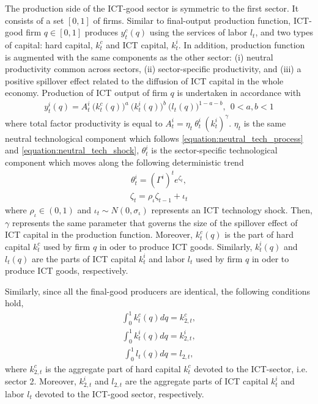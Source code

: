 \documentclass[12pt]{article}
\begin{document}
The production side of the ICT-good sector is symmetric to the first sector. It consists of a set $[0,1]$ of firms. Similar to final-output production function, ICT-good firm $q \in [0,1]$ produces $y^c_t(q)$ using the services of labor $l_{t}$, and two types of capital: hard capital, $k^c_{t}$ and ICT capital, $k^i_{t}$. In addition, production function is augmented with the same components as the other sector: (i) neutral productivity common across sectors, (ii) sector-specific productivity, and (iii) a positive spillover effect related to the diffusion of ICT capital in the whole economy. Production of ICT output of firm $q$ is undertaken in accordance with
\begin{eqnarray}\label{equation:productionICT}
y^i_t(q) = A^i_t \ \big( k^c_{t}(q) \big)^a \ \big( k^i_{t}(q) \big)^b \ \big( l_{t}(q) \big)^{1-a-b}, \ \ 0 < a,b < 1
\end{eqnarray}
where total factor productivity is equal to $ A_t^i = \eta_t \ \theta^i_t \ (k^i_{t})^{\gamma} $. $\eta_t$ is the same neutral technological component which follows \ref{equation:neutral_tech_process} and \ref{equation:neutral_tech_shock}, $\theta^i_t$ is the sector-specific technological component which moves along the following deterministic trend
\begin{eqnarray}\label{equation:ICT_tech_process}
\theta^i_t = (\Gamma^{i})^t e^{\zeta_t},  
\end{eqnarray} 
\begin{eqnarray}\label{equation:ICT_tech_shock}
\zeta_t = \rho_{\iota} \zeta_{t-1} + \iota_t
\end{eqnarray} 
where $\rho_{\iota} \in (0,1)$ and $\iota_t \sim N(0,\sigma_{\iota})$ represents an ICT technology shock.
Then, $\gamma$ represents the same parameter that governs the size of the spillover effect of ICT capital in the production function. Moreover, $k^c_{t}(q)$ is the part of hard capital $k^c_t$ used by firm $q$ in oder to produce ICT goods. Similarly, $k^i_{t}(q)$ and $l_{t}(q)$ are the parts of ICT capital $k^i_t$ and labor $l_t$ used by firm $q$ in oder to produce ICT goods, respectively. 

Similarly, since all the final-good producers are identical, the following conditions hold,
\begin{eqnarray}\label{equation:aggregation_hard_ICTsec}
\int_0^1 k^c_{t}(q) dq = k^c_{2,t},
\end{eqnarray}
\begin{eqnarray}\label{equation:aggregation_ICT_ICTsec}
\int_0^1 k^i_{t}(q) dq = k^i_{2,t}, 
\end{eqnarray}
\begin{eqnarray}\label{equation:aggregation_labor_ICTsec}
\int_0^1 l_{t}(q) dq = l_{2,t},
\end{eqnarray}
where $k^c_{2,t}$ is the aggregate part of hard capital $k^c_t$ devoted to the ICT-sector, i.e. sector 2. Moreover, $k^i_{2,t}$ and $l_{2,t}$ are the aggregate parts of ICT capital $k^i_{t}$ and labor $l_{t}$ devoted to the ICT-good sector, respectively. 
\end{document}

